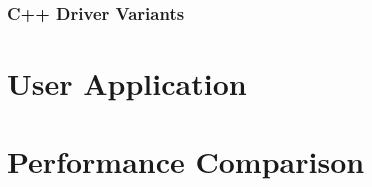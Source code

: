 \subsubsection*{C++ Driver Variants}
 


\section{User Application}

\section{Performance Comparison}

